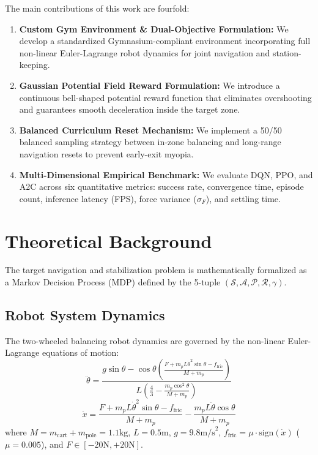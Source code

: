 \documentclass[journal,twocolumn]{IEEEtran}
\begin{document}
The main contributions of this work are fourfold:
\begin{enumerate}[leftmargin=*]
\item \textbf{Custom Gym Environment \& Dual-Objective Formulation:} We develop a standardized Gymnasium-compliant environment incorporating full non-linear Euler-Lagrange robot dynamics for joint navigation and station-keeping.
\item \textbf{Gaussian Potential Field Reward Formulation:} We introduce a continuous bell-shaped potential reward function that eliminates overshooting and guarantees smooth deceleration inside the target zone.
\item \textbf{Balanced Curriculum Reset Mechanism:} We implement a 50/50 balanced sampling strategy between in-zone balancing and long-range navigation resets to prevent early-exit myopia.
\item \textbf{Multi-Dimensional Empirical Benchmark:} We evaluate DQN, PPO, and A2C across six quantitative metrics: success rate, convergence time, episode count, inference latency (FPS), force variance ($\sigma_F$), and settling time.
\end{enumerate}

\section{Theoretical Background}
The target navigation and stabilization problem is mathematically formalized as a Markov Decision Process (MDP) defined by the 5-tuple $(\mathcal{S}, \mathcal{A}, \mathcal{P}, \mathcal{R}, \gamma)$.

\subsection{Robot System Dynamics}
The two-wheeled balancing robot dynamics are governed by the non-linear Euler-Lagrange equations of motion:
\begin{equation}
\ddot{\theta} = \frac{g \sin\theta - \cos\theta \left( \frac{F + m_p L \dot{\theta}^2 \sin\theta - f_{\text{fric}}}{M + m_p} \right)}{L \left( \frac{4}{3} - \frac{m_p \cos^2\theta}{M + m_p} \right)}
\end{equation}
\begin{equation}
\ddot{x} = \frac{F + m_p L \dot{\theta}^2 \sin\theta - f_{\text{fric}}}{M + m_p} - \frac{m_p L \ddot{\theta} \cos\theta}{M + m_p}
\end{equation}
where $M = m_{\text{cart}} + m_{\text{pole}} = 1.1\text{kg}$, $L = 0.5\text{m}$, $g = 9.8\text{m/s}^2$, $f_{\text{fric}} = \mu \cdot \text{sign}(\dot{x})$ ($\mu = 0.005$), and $F \in [-20\text{N}, +20\text{N}]$.
\end{document}
